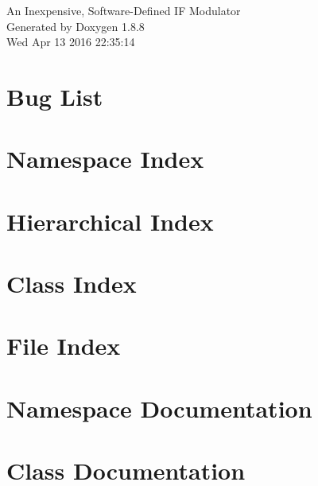 \documentclass[twoside]{book}
\newcommand{\+}{\discretionary{\mbox{\scriptsize$\hookleftarrow$}}{}{}}
\newcommand{\clearemptydoublepage}{%
  \newpage{\pagestyle{empty}\cleardoublepage}%
}
\begin{document}
\hypersetup{pageanchor=false,
             bookmarks=true,
             bookmarksnumbered=true,
             pdfencoding=unicode
            }
\begin{titlepage}
\vspace*{7cm}
\begin{center}%
{\Large An Inexpensive, Software-\/\+Defined I\+F Modulator }\\
\vspace*{1cm}
{\large Generated by Doxygen 1.8.8}\\
\vspace*{0.5cm}
{\small Wed Apr 13 2016 22:35:14}\\
\end{center}
\end{titlepage}
\clearemptydoublepage
\tableofcontents
\clearemptydoublepage
{}
\hypersetup{pageanchor=true}

\chapter{Bug List}
\label{bug}
\hypertarget{bug}{}

\chapter{Namespace Index}

\chapter{Hierarchical Index}

\chapter{Class Index}

\chapter{File Index}

\chapter{Namespace Documentation}

\chapter{Class Documentation}





\end{document}
